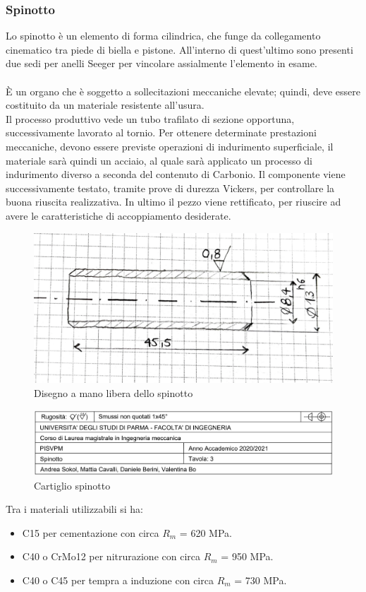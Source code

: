 \subsubsection{Spinotto}
Lo spinotto è un elemento di forma cilindrica, che funge da collegamento cinematico tra piede di biella e pistone. All'interno di quest'ultimo sono presenti due sedi per anelli Seeger per vincolare assialmente l'elemento in esame. \\
\\
È un organo che è soggetto a sollecitazioni meccaniche elevate; quindi, deve essere costituito da un materiale resistente all’usura.\\ 
Il processo produttivo vede un tubo trafilato di sezione opportuna, successivamente lavorato al tornio. Per ottenere determinate prestazioni meccaniche, devono essere previste operazioni di indurimento superficiale, il materiale sarà quindi un acciaio, al quale sarà applicato un processo di indurimento diverso a seconda del contenuto di Carbonio. Il componente viene successivamente testato, tramite prove di durezza Vickers, per controllare la buona riuscita realizzativa. In ultimo il pezzo viene rettificato, per riuscire ad avere le caratteristiche di accoppiamento desiderate. \\
\begin{figure}[h]
    \centering
    \includegraphics[scale=0.4]{Immagini/SchizzoSpinotto.png}
    \caption{Disegno a mano libera dello spinotto}
    \label{fig:SchizzoSpinotto}
\end{figure}
\begin{figure}[h]
    \centering
    \includegraphics[scale=0.5]{Immagini/CartiglioSpinotto.png}
    \caption{Cartiglio spinotto}
    \label{fig:CartiglioSpinotto}
\end{figure}
\newpage
Tra i materiali utilizzabili si ha:
\begin{itemize}
    \item C15 per cementazione con circa $R_m$ = 620 MPa.
    \item C40 o CrMo12 per nitrurazione con circa $R_m$ = 950 MPa.
    \item C40 o C45 per tempra a induzione con circa $R_m$ = 730 MPa.
\end{itemize}
